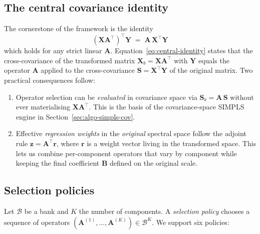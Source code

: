 \documentclass[review,a4paper]{elsarticle}
\newcommand{\Xmat}{\mathbf{X}}
\newcommand{\Ymat}{\mathbf{Y}}
\newcommand{\Bmat}{\mathbf{B}}
\newcommand{\Amat}{\mathbf{A}}
\newcommand{\Smat}{\mathbf{S}}
\newcommand{\zvec}{\mathbf{z}}
\newcommand{\rvec}{\mathbf{r}}
\newcommand{\SIMPLS}{\textsc{SIMPLS}\xspace}
\begin{document}
\subsection{The central covariance identity}
The cornerstone of the framework is the identity
\begin{equation}
\boxed{\;
(\Xmat\Amat^\top)^\top \Ymat \;=\; \Amat\,\Xmat^\top \Ymat
\;}
\label{eq:central-identity}
\end{equation}
which holds for any strict linear $\Amat$. Equation~\eqref{eq:central-identity}
states that the cross-covariance of the transformed matrix
$\Xmat_b=\Xmat\Amat^\top$ with $\Ymat$ equals the operator $\Amat$
applied to the cross-covariance $\Smat=\Xmat^\top\Ymat$ of the original
matrix. Two practical consequences follow:

\begin{enumerate}[leftmargin=2em,label=(\arabic*)]
  \item Operator selection can be \emph{evaluated} in covariance space
        via $\Smat_b=\Amat\,\Smat$ without ever materialising
        $\Xmat\Amat^\top$. This is the basis of the covariance-space
        \SIMPLS engine in Section~\ref{sec:algo-simpls-cov}.
  \item Effective \emph{regression weights} in the \emph{original}
        spectral space follow the adjoint rule
        $\zvec=\Amat^\top\rvec$, where $\rvec$ is a weight vector
        living in the transformed space. This lets us combine
        per-component operators that vary by component while keeping
        the final coefficient $\Bmat$ defined on the original scale.
\end{enumerate}

\subsection{Selection policies}
Let $\mathcal{B}$ be a bank and $K$ the number of components. A
\emph{selection policy} chooses a sequence of operators
$(\Amat^{(1)},\dots,\Amat^{(K)})\in\mathcal{B}^K$. We support six
policies:
\end{document}
